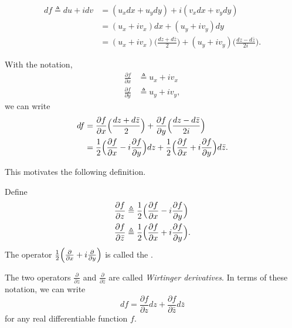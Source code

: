 \begin{align*}
	df \triangleq du + idv &=  (u_x dx + u_y dy) + i ( v_x dx + v_y dy) \\
	&= (u_x + i v_x) dx + (u_y  + i v_y) dy \\
	&= (u_x + i v_x)  \Big(\frac{dz + d\bar{z}}{2} \Big)   + (u_y  + i v_y) \Big(\frac{dz - d\bar{z}}{2i}\Big) .
\end{align*}

With the notation, 
\begin{align*}
	\frac{\partial f}{\partial x}  & \triangleq  u_x  + i v_x \\
	\frac{\partial f}{\partial y}  & \triangleq  u_y + i v_y,
\end{align*}
we can write
\begin{align*}
	df & = \frac{\partial f}{\partial x} \Big(\frac{dz + d\bar{z}}{2} \Big)  + \frac{\partial f}{\partial y} \Big(\frac{dz - d\bar{z}}{2i}  \Big) \\
	&= \frac{1}{2} \Big( \frac{\partial f}{\partial x} - i \frac{\partial f}{\partial y}\Big) dz + \frac{1}{2} \Big( \frac{\partial f}{\partial x} + i \frac{\partial f}{\partial y}\Big) d\bar{z}.
\end{align*}

This motivates the following definition.


\begin{svgraybox} 
	\begin{definition}\label{def:del_bar}   
		Define  
		\begin{align*}
			\frac{\partial f}{\partial z} &\triangleq \frac{1}{2} \Big( \frac{\partial f}{\partial x} - i \frac{\partial f}{\partial y}\Big) \\
			\frac{\partial f}{\partial \bar{z}} &\triangleq \frac{1}{2} \Big( \frac{\partial f}{\partial x} + i \frac{\partial f}{\partial y}\Big).
		\end{align*}
		The operator $\frac{1}{2} \Big( \frac{\partial }{\partial x} + i \frac{\partial }{\partial y}\Big)$ is called the .
	\end{definition}
\end{svgraybox}
The two operators $\frac{\partial}{\partial z}$ and $\frac{\partial}{\partial \bar{z}}$ are called {\em Wirtinger derivatives}. In terms of these notation, we can write 
\begin{equation}
	df =  \frac{\partial f}{\partial z} dz + \frac{\partial f}{\partial \bar{z}}d \bar{z}
	\label{eq:real_differential_f}
\end{equation}
for any real differentiable function $f$.


